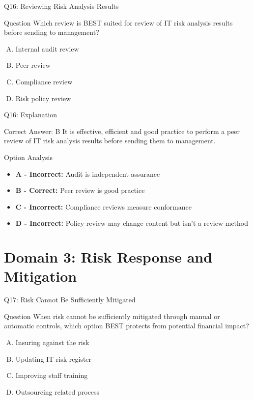 \documentclass{beamer}
\begin{document}
	\begin{frame}{Q16: Reviewing Risk Analysis Results}
		\begin{block}{Question}
			Which review is BEST suited for review of IT risk analysis results before sending to management?
		\end{block}
		\begin{enumerate}[(A)]
			\item Internal audit review
			\item Peer review
			\item Compliance review
			\item Risk policy review
		\end{enumerate}
	\end{frame}
	
	\begin{frame}{Q16: Explanation}
		\begin{block}{Correct Answer: B}
			It is effective, efficient and good practice to perform a peer review of IT risk analysis results before sending them to management.
		\end{block}
		\begin{block}{Option Analysis}
			\begin{itemize}
				\item \textbf{A - Incorrect:} Audit is independent assurance
				\item \textbf{B - Correct:} Peer review is good practice
				\item \textbf{C - Incorrect:} Compliance reviews measure conformance
				\item \textbf{D - Incorrect:} Policy review may change content but isn't a review method
			\end{itemize}
		\end{block}
	\end{frame}
	
	
	\section{Domain 3: Risk Response and Mitigation}
	
	\begin{frame}{Q17: Risk Cannot Be Sufficiently Mitigated}
		\begin{block}{Question}
			When risk cannot be sufficiently mitigated through manual or automatic controls, which option BEST protects from potential financial impact?
		\end{block}
		\begin{enumerate}[(A)]
			\item Insuring against the risk
			\item Updating IT risk register
			\item Improving staff training
			\item Outsourcing related process
		\end{enumerate}
	\end{frame}
	
\end{document}
